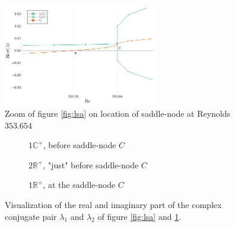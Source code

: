 \begin{figure}[h!]
  \centering
  \includegraphics[width=0.6\textwidth]{figs/lsa_sn_zoom96x96.png}
  \caption{Zoom of figure \ref{fig:lsa} on location of saddle-node at Reynolds $353.654$} 
  \label{fig:lsa_zoom}
\end{figure}

\begin{figure}[h]
\centering
\begin{subfigure}[b]{0.3\textwidth}
  \centering
  \caption{$1\mathbb{C}^+$, before saddle-node $C$ \newline}
\end{subfigure}
\begin{subfigure}[b]{0.3\textwidth}
  \centering
\caption{$2\mathbb{R}^+$, "just" before saddle-node $C$}
\end{subfigure}
\begin{subfigure}[b]{0.3\textwidth}
  \centering
\caption{$1\mathbb{R}^+$, at the saddle-node $C$ \newline}
\end{subfigure}
\caption{Visualization of the real and imaginary part of the complex conjugate pair
  $\lambda_1$ and $\lambda_2$ of figure \ref{fig:lsa} and \ref{fig:lsa_zoom}.}
\label{fig:complexplane}
\end{figure} 

